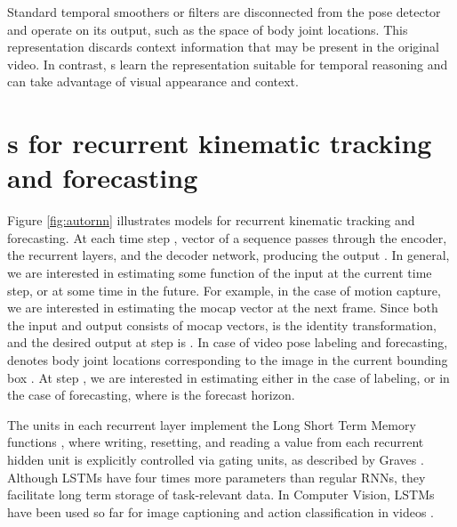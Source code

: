 \documentclass[10pt,twocolumn,letterpaper]{article}
\begin{document}
Standard temporal smoothers or filters are  disconnected from the pose detector and operate on its output, such as the space of body joint locations. This representation discards context information that may be present in the original video. In contrast, s learn the  representation suitable for temporal reasoning and can take advantage of visual appearance and context.














 \section{s for recurrent kinematic tracking and forecasting}



Figure \ref{fig:autornn} illustrates    models for recurrent kinematic tracking and forecasting.    
At  each time step , vector  of a sequence   passes through the encoder, the recurrent layers, and the decoder network, producing the output . 
In general, we are interested in estimating some function  of the input  at the current time step, or at some time in the future. For example, in the case of motion capture, we are interested in estimating the mocap vector at the next frame. Since both the input and output consists of mocap vectors,  is the identity transformation, and the desired output at step  is .
In case of video pose labeling and forecasting,  denotes body joint locations corresponding to the image in the current bounding box . At step , we are interested in estimating either  in the case of labeling, or  in the case of forecasting, where  is the forecast horizon.



The units in each recurrent layer  implement the Long Short Term Memory functions \cite{Hochreiter:1997:LSM:1246443.1246450}, where writing, resetting, and reading a value from each recurrent hidden unit is explicitly controlled via gating units, as described by Graves \cite{DBLP:journals/corr/Graves13}. Although LSTMs have four times more parameters than regular RNNs, they  facilitate long term storage of task-relevant data. In Computer Vision, LSTMs have been used  so far for image captioning  \cite{DBLP:journals/corr/VinyalsTBE14} and action classification in videos \cite{DBLP:journals/corr/DonahueHGRVSD14}.   
\end{document}
